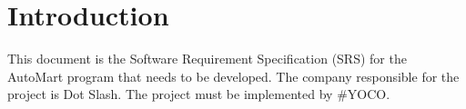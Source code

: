 \section{Introduction}
This document is the Software Requirement Specification (SRS) for the AutoMart program that needs to be developed. The company responsible for the project is Dot Slash. The project must be implemented by \#YOCO.